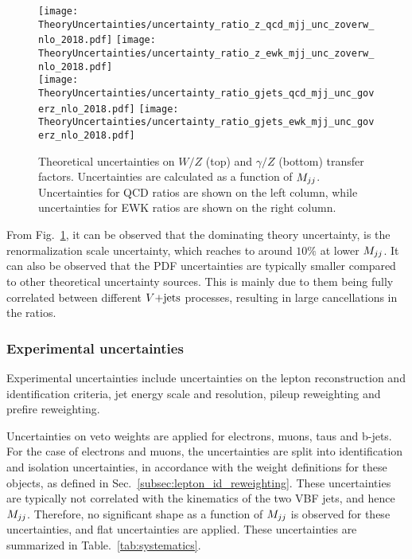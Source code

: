 \begin{figure}[htbp]
  \centering
    \texttt{[image: TheoryUncertainties/uncertainty\_ratio\_z\_qcd\_mjj\_unc\_zoverw\_nlo\_2018.pdf]}
    \texttt{[image: TheoryUncertainties/uncertainty\_ratio\_z\_ewk\_mjj\_unc\_zoverw\_nlo\_2018.pdf]} \\
    \texttt{[image: TheoryUncertainties/uncertainty\_ratio\_gjets\_qcd\_mjj\_unc\_goverz\_nlo\_2018.pdf]}
    \texttt{[image: TheoryUncertainties/uncertainty\_ratio\_gjets\_ewk\_mjj\_unc\_goverz\_nlo\_2018.pdf]}
  \caption{Theoretical uncertainties on $W/Z$ (top) and $\gamma/Z$ (bottom) transfer factors. Uncertainties are calculated as a
  function of $M_{jj}$. Uncertainties for QCD ratios are shown on the left column, while uncertainties for EWK ratios are shown on the right column.}
  \label{fig:theory_uncs}
\end{figure}

From Fig.~\ref{fig:theory_uncs}, it can be observed that the dominating theory uncertainty, is the renormalization
scale uncertainty, which reaches to around $10\%$ at lower $M_{jj}$. It can also be observed that the PDF uncertainties are typically smaller compared to
other theoretical uncertainty sources. This is mainly due to them being fully correlated between different $V\text{+jets}$ processes, resulting in large cancellations 
in the ratios. 

\clearpage

\subsubsection{Experimental uncertainties}

Experimental uncertainties include uncertainties on the lepton reconstruction and identification criteria, jet energy scale and resolution, 
pileup reweighting and prefire reweighting.

Uncertainties on veto weights are applied for electrons, muons, taus and b-jets. For the case of electrons and muons, the uncertainties are split
into identification and isolation uncertainties, in accordance with the weight definitions for these objects, as defined in Sec.~\ref{subsec:lepton_id_reweighting}.
These uncertainties are typically not correlated with the kinematics of the two VBF jets, and hence $M_{jj}$. Therefore, no significant shape as a function of $M_{jj}$ 
is observed for these uncertainties, and flat uncertainties are applied. These uncertainties are summarized in Table.~\ref{tab:systematics}.

